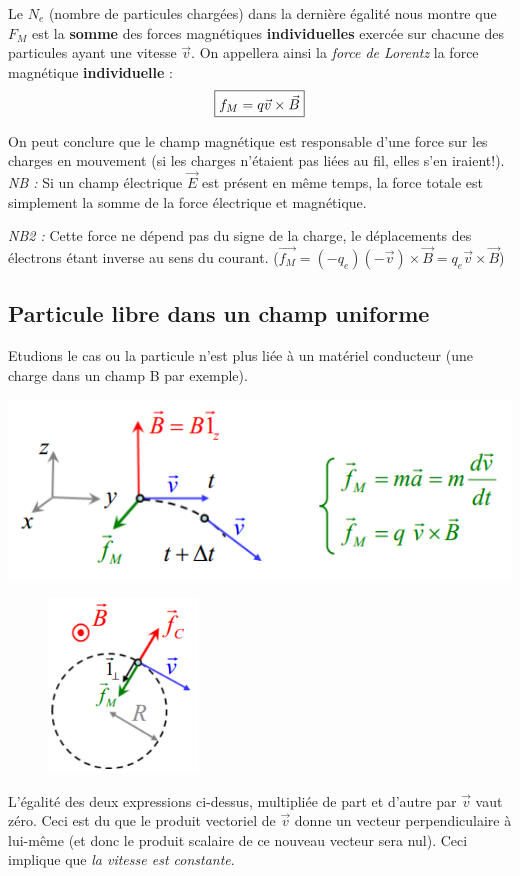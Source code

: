 \documentclass	[11pt, a4paper, openany]{book}
\begin{document}
Le $N_e$ (nombre de particules chargées) dans la dernière égalité nous montre que $F_M$ est la \textbf{somme} des forces magnétiques \textbf{individuelles} exercée sur chacune des particules ayant une vitesse $\vec{v}$. On appellera ainsi la \textit{force de Lorentz} la force magnétique \textbf{individuelle} :
\begin{equation}
\fbox{$f_M = q \vec{v} \times \vec{B} $}
\end{equation}

On peut conclure que le champ magnétique est responsable d'une force sur les charges en mouvement (si les charges n'étaient pas liées au fil, elles s'en iraient!).\\


\textit{NB : } Si un champ électrique $\vec{E}$ est présent en même temps, la force totale est simplement la somme de la force électrique et magnétique.

\textit{NB2 :} Cette force ne dépend pas du signe de la charge, le déplacements des électrons étant inverse au sens du courant. ($\vec{f_M} = (-q_e)(-\vec{v})\times \vec{B} = q_e \vec{v} \times \vec{B}$) \\

\subsection{Particule libre dans un champ uniforme}
Etudions le cas ou la particule n'est plus liée à un matériel conducteur (une charge dans un champ B par exemple).
\begin{center}
\includegraphics[scale=0.75]{magneto/image2.png}
\end{center}
\begin{figure}
\includegraphics[width=4cm]{magneto/image3.png}
\end{figure}
L'égalité des deux expressions ci-dessus, multipliée de part et d'autre par $\vec{v}$ vaut zéro. Ceci est du que le produit vectoriel de $\vec{v}$ donne un vecteur perpendiculaire à lui-même (et donc le produit scalaire de ce nouveau vecteur sera nul). Ceci implique que \textit{la vitesse est constante}.
\end{document}
